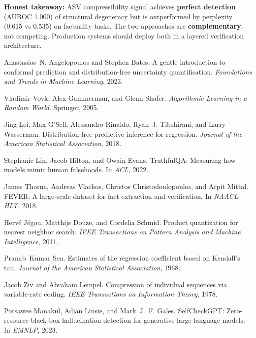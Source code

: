 \documentclass[11pt]{article}
\begin{document}
\textbf{Honest takeaway:} ASV compressibility signal achieves \textbf{perfect detection} (AUROC 1.000) of structural degeneracy but is outperformed by perplexity (0.615 vs 0.535) on factuality tasks. The two approaches are \textbf{complementary}, not competing. Production systems should deploy both in a layered verification architecture.


\begin{thebibliography}{10}

Anastasios~N. Angelopoulos and Stephen Bates.
\newblock A gentle introduction to conformal prediction and distribution-free uncertainty quantification.
\newblock \emph{Foundations and Trends in Machine Learning}, 2023.

Vladimir Vovk, Alex Gammerman, and Glenn Shafer.
\newblock \emph{Algorithmic Learning in a Random World}.
\newblock Springer, 2005.

Jing Lei, Max G'Sell, Alessandro Rinaldo, Ryan~J. Tibshirani, and Larry Wasserman.
\newblock Distribution-free predictive inference for regression.
\newblock \emph{Journal of the American Statistical Association}, 2018.

Stephanie Lin, Jacob Hilton, and Owain Evans.
\newblock TruthfulQA: Measuring how models mimic human falsehoods.
\newblock In \emph{ACL}, 2022.

James Thorne, Andreas Vlachos, Christos Christodoulopoulos, and Arpit Mittal.
\newblock FEVER: A large-scale dataset for fact extraction and verification.
\newblock In \emph{NAACL-HLT}, 2018.

Herv\'{e} J\'{e}gou, Matthijs Douze, and Cordelia Schmid.
\newblock Product quantization for nearest neighbor search.
\newblock \emph{IEEE Transactions on Pattern Analysis and Machine Intelligence}, 2011.

Pranab~Kumar Sen.
\newblock Estimates of the regression coefficient based on Kendall's tau.
\newblock \emph{Journal of the American Statistical Association}, 1968.

Jacob Ziv and Abraham Lempel.
\newblock Compression of individual sequences via variable-rate coding.
\newblock \emph{IEEE Transactions on Information Theory}, 1978.

Potsawee Manakul, Adian Liusie, and Mark~J.~F. Gales.
\newblock SelfCheckGPT: Zero-resource black-box hallucination detection for generative large language models.
\newblock In \emph{EMNLP}, 2023.

\end{thebibliography}
\end{document}
